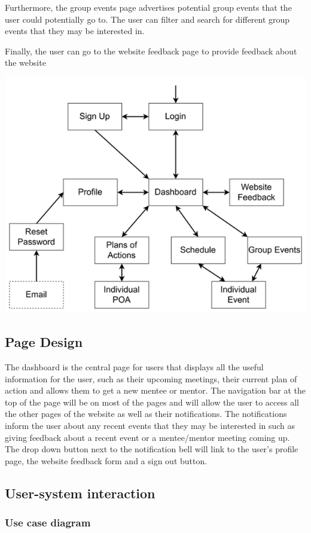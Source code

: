 \documentclass[10pt]{article}
\begin{document}
Furthermore, the group events page advertises potential group events that the
user could potentially go to. The user can filter and search for different group
events that they may be interested in.

Finally, the user can go to the website feedback page to provide feedback about
the website

\includegraphics{Hierarchy}

\subsection{Page Design}
The dashboard is the central page for users that displays all the useful
information for the user, such as their upcoming meetings, their current plan of
action and allows them to get a new mentee or mentor. The navigation bar at the
top of the page will be on most of the pages and will allow the user to access
all the other pages of the website as well as their notifications. The
notifications inform the user about any recent events that they may be
interested in such as giving feedback about a recent event or a mentee/mentor
meeting coming up. The drop down button next to the notification bell will link
to the user’s profile page, the website feedback form and a sign out button.

\subsection{User-system interaction}
\subsubsection{Use case diagram}
\end{document}
